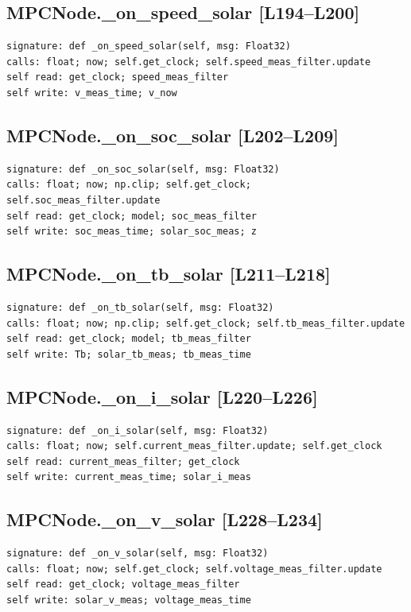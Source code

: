 \documentclass[a4paper,10pt,oneside]{book}
\begin{document}
\subsection*{MPCNode.\_on\_speed\_solar [L194--L200]}
\begin{lstlisting}[numbers=none]
signature: def _on_speed_solar(self, msg: Float32)
calls: float; now; self.get_clock; self.speed_meas_filter.update
self read: get_clock; speed_meas_filter
self write: v_meas_time; v_now
\end{lstlisting}
\subsection*{MPCNode.\_on\_soc\_solar [L202--L209]}
\begin{lstlisting}[numbers=none]
signature: def _on_soc_solar(self, msg: Float32)
calls: float; now; np.clip; self.get_clock; self.soc_meas_filter.update
self read: get_clock; model; soc_meas_filter
self write: soc_meas_time; solar_soc_meas; z
\end{lstlisting}
\subsection*{MPCNode.\_on\_tb\_solar [L211--L218]}
\begin{lstlisting}[numbers=none]
signature: def _on_tb_solar(self, msg: Float32)
calls: float; now; np.clip; self.get_clock; self.tb_meas_filter.update
self read: get_clock; model; tb_meas_filter
self write: Tb; solar_tb_meas; tb_meas_time
\end{lstlisting}
\subsection*{MPCNode.\_on\_i\_solar [L220--L226]}
\begin{lstlisting}[numbers=none]
signature: def _on_i_solar(self, msg: Float32)
calls: float; now; self.current_meas_filter.update; self.get_clock
self read: current_meas_filter; get_clock
self write: current_meas_time; solar_i_meas
\end{lstlisting}
\subsection*{MPCNode.\_on\_v\_solar [L228--L234]}
\begin{lstlisting}[numbers=none]
signature: def _on_v_solar(self, msg: Float32)
calls: float; now; self.get_clock; self.voltage_meas_filter.update
self read: get_clock; voltage_meas_filter
self write: solar_v_meas; voltage_meas_time
\end{lstlisting}
\end{document}
